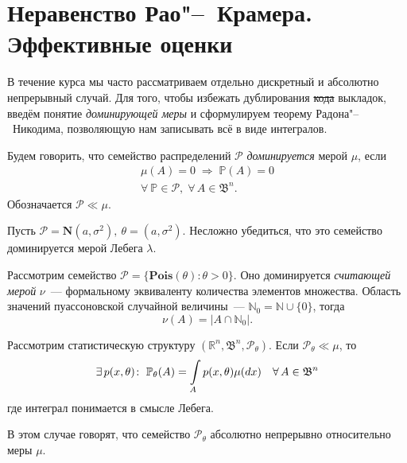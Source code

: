 \section{Неравенство Рао"--~Крамера. Эффективные оценки}

В течение курса мы часто рассматриваем отдельно дискретный и абсолютно непрерывный случай.
Для того, чтобы избежать дублирования \sout{кода} выкладок, введём понятие \textit{доминирующей меры} и сформулируем теорему Радона"--~Никодима, 
позволяющую нам записывать всё в виде интегралов.

\begin{defn}
    Будем говорить, что семейство распределений $\mathcal{P}$ \textit{доминируется} мерой $\mu$, если 
    \begin{gather*}
        \mu(A) = 0 \; \Rightarrow \; \mathbb{P} (A) = 0 \\ 
        \forall \: \mathbb{P} \in \mathcal{P}, \; \forall\, A \in \mathfrak{B}^n.
    \end{gather*}
    Обозначается $\mathcal{P} \ll \mu$.
\end{defn}

\begin{exmp}
    Пусть $\mathcal{P} = \mathbf{N}(a, \sigma^2), \: \theta = (a, \sigma^2)$.
    Несложно убедиться, что это семейство доминируется мерой Лебега $\lambda$.

    Рассмотрим семейство $\mathcal{P} = \bigl\{ \mathbf{Pois}(\theta)\colon \theta > 0\bigr\}$.
    Оно доминируется \textit{считающей мерой} $\nu$~--- формальному эквиваленту количества элементов множества.
    Область значений пуассоновской случайной величины~--- $\mathbb{N}_0 = \mathbb{N} \cup \{0\}$, тогда
    \begin{equation*}
        \nu(A) = \bigl| A \cap \mathbb{N}_0 \bigr|.
    \end{equation*}
\end{exmp}

\hypertarget{Radon_Nikodim_thm}{}
\begin{namedthm}
    Рассмотрим статистическую структуру $(\mathbb{R}^n, \mathfrak{B}^n, \mathcal{P}_\theta)$.
    Если $\mathcal{P}_\theta \ll \mu$, то
    \begin{equation*}
        \exists \, p(x, \theta)\colon \; \mathbb{P}_{\theta} (A) = \int\limits_{A} p(x, \theta) \mu(dx) \quad \forall \, A \in \mathfrak{B}^n
    \end{equation*}
    где интеграл понимается в смысле Лебега.

    В этом случае говорят, что семейство $\mathcal{P}_\theta$ абсолютно непрерывно относительно меры $\mu$.
\end{namedthm}

